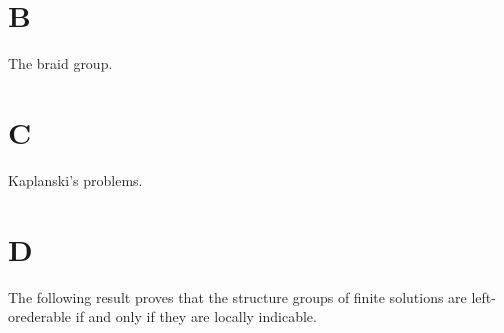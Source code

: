 %
%
%
%
%
%
%
%	



\section*{B}

The braid group. 

\section*{C}

Kaplanski's problems. 

\section*{D}

The following result proves that the structure groups of finite solutions
are left-orederable if and only if they are locally indicable. 

